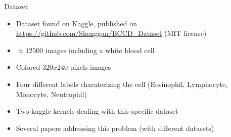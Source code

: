 \documentclass[15pt]{beamer}
\begin{document}
{
\begin{frame}{Dataset}
  \begin{itemize}
    \item Dataset found on Kaggle, published on \url{https://github.com/Shenggan/BCCD_Dataset} \newline (MIT license)
    \item $\approx 12500$ images including a white blood cell
    \item Colored $320 x 240$ pixels images
    \item Four different labels charaterizing the cell (Eosinophil, Lymphocyte, Monocyte, Neutrophil)
    \item Two kaggle kernels dealing with this specific dataset
    \item Several papers addressing this problem (with different datasets)

  \end{itemize}
\end{frame}
}
\end{document}
